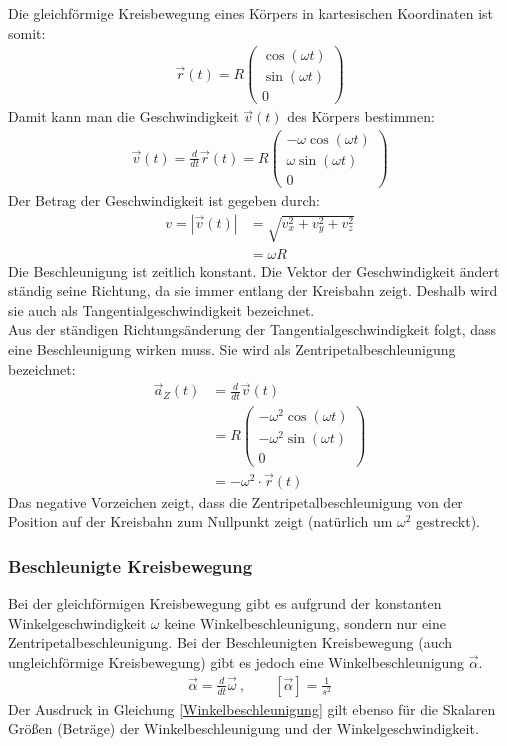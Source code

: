 \documentclass{article}
\begin{document}
\noindent Die gleichförmige Kreisbewegung eines Körpers in kartesischen Koordinaten ist somit:
\begin{align}
    \vec{r}(t)=R\left(\begin{matrix}
        \cos(\omega t)\\ \sin(\omega t)\\0
    \end{matrix}\right)
\end{align}
Damit kann man die Geschwindigkeit $\vec{v}(t)$ des Körpers bestimmen:
\begin{align}
    \vec{v}(t)=\frac{d}{dt}\vec{r}(t)=R\left(\begin{matrix}
        -\omega\cos(\omega t)\\ \omega\sin(\omega t)\\0
    \end{matrix}\right)
\end{align}
Der Betrag der Geschwindigkeit ist gegeben durch:
\begin{align}
    v=|\vec{v}(t)|&=\sqrt{v_x^2+v_y^2+v_z^2}\\
    &=\omega R
\end{align}
Die Beschleunigung ist zeitlich konstant. Die Vektor der Geschwindigkeit ändert ständig seine Richtung, da sie immer entlang der
Kreisbahn zeigt. Deshalb wird sie auch als Tangentialgeschwindigkeit bezeichnet.\\
Aus der ständigen Richtungsänderung der Tangentialgeschwindigkeit folgt, dass eine Beschleunigung wirken muss.
Sie wird als Zentripetalbeschleunigung bezeichnet:
\begin{align}
    \vec{a}_Z(t)&=\frac{d}{dt}\vec{v}(t)\\
    &=R\left(\begin{matrix}
        -\omega^2\cos(\omega t)\\-\omega^2\sin(\omega t)\\0
    \end{matrix}\right)\\
    &=-\omega^2\cdot \vec{r}(t)
\end{align}
Das negative Vorzeichen zeigt, dass die Zentripetalbeschleunigung von der Position auf der Kreisbahn zum Nullpunkt zeigt (natürlich um $\omega^2$ gestreckt).

\subsubsection{Beschleunigte Kreisbewegung}
Bei der gleichförmigen Kreisbewegung gibt es aufgrund der konstanten 
Winkelgeschwindigkeit $\omega$ keine Winkelbeschleunigung, sondern nur eine Zentripetalbeschleunigung.
Bei der Beschleunigten Kreisbewegung (auch ungleichförmige Kreisbewegung) gibt es jedoch eine 
Winkelbeschleunigung $\vec{\alpha}$.
\begin{align}
    \vec{\alpha}=\frac{d}{dt}\vec{\omega}\ ,\qquad [\vec{\alpha}]=\frac{1}{s^2} \label{Winkelbeschleunigung}
\end{align}
Der Ausdruck in Gleichung \ref{Winkelbeschleunigung} gilt ebenso für die Skalaren Größen (Beträge) der Winkelbeschleunigung und der Winkelgeschwindigkeit.\\
\end{document}
